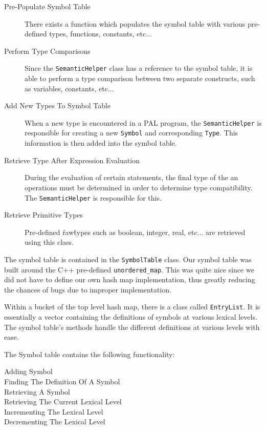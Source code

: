 \documentclass{article}
\begin{document}
\begin{description}
	
\item[Pre-Populate Symbol Table]
	There exists a function which populates the symbol table with various pre-defined types,
	functions, constants, etc...
	
\item[Perform Type Comparisons]
	Since the \texttt{SemanticHelper} class has a reference to the symbol table, it is able to
	perform a type comparison between two separate constructs, such as variables, constants, etc...
	
\item[Add New Types To Symbol Table]
	When a new type is encountered in a PAL program, the \texttt{SemanticHelper} is responsible for creating
	a new \texttt{Symbol} and corresponding \texttt{Type}. This information is then added into the symbol table.
	
\item[Retrieve Type After Expression Evaluation]
	During the evaluation of certain statements, the final type of the an operations must be determined in order
	to determine type compatibility. The \texttt{SemanticHelper} is responsible for this.
	
\item [Retrieve Primitive Types]
	Pre-defined \'raw\' types such as boolean, integer, real, etc... are retrieved using this class.

\end{description}
	

The symbol table is contained in the \texttt{SymbolTable} class. Our symbol table was built around the C++ pre-defined
\texttt{unordered\_map}. This was quite nice since we did not have to define our own hash map implementation, thus
greatly reducing the chances of bugs due to improper implementation. 

Within a bucket of the top level hash map, there is a class called \texttt{EntryList}. It is essentially a vector containing the definitions of symbols at various lexical levels. The symbol table's methods handle the different definitions at various
levels with ease.

The Symbol table contains the following functionality:

\begin{description}
	
\item[Adding Symbol]

\item[Finding The Definition Of A Symbol]

\item[Retrieving A Symbol]

\item[Retrieving The Current Lexical Level]

\item[Incrementing The Lexical Level]

\item[Decrementing The Lexical Level]
	
\end{description}
\end{document}

